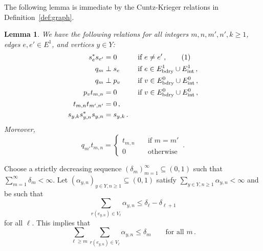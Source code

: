 \documentclass[12pt, a4paper]
{amsart}
\newcommand\numberthis{\addtocounter{equation}{1}\tag{\theequation}}
\newtheorem{lemma}[thm]{Lemma}
\theoremstyle{definition}
\theoremstyle{remark}
\numberwithin{equation}{section}
\newcommand{\Eboundary}{E^0_{\mathrm{bdry}}}
\newcommand{\Eint}{E^0_{\mathrm{int}}}
\newcommand{\edgebdy}{E^1_{\mathrm{bdry}}}
\newcommand{\edgeint}{E^1_{\mathrm{int}}}
\begin{document}
The following lemma is immediate by the Cuntz-Krieger relations in Definition~\ref{def:graph}.
\begin{lemma}\label{lemma:orthogonality}
    We have the following relations for all integers $m,n,m',n',k \ge 1$, edges $e, e' \in E^1$, and vertices $y \in Y$:
    \begin{align*}
    s_e^* s_{e'} &= 0 &&\text{ if } e \neq e'\,,\numberthis\\
    q_m &\perp s_e  &&\text{ if } e \in \edgebdy \cup \edgeint\,,\\
    q_m &\perp p_v  &&\text{ if } v \in \Eboundary \cup \Eint\,,\\    
    p_v t_{m,n} &= 0 &&\text{ if } v \in \Eboundary \cup \Eint\,,\\
    t_{m,n} t_{m',n'} &= 0\,, \\
    s_{y,k} s_{y,n}^* s_{y,n} &= s_{y,k}\,.
    \end{align*}
    Moreover, 
    \begin{equation}
        q_{m'} t_{m,n} =
    \begin{cases}
        t_{m,n} \quad &\text{if } m = m'\\
        0 \quad &\text{otherwise}
    \end{cases}\,.
    \end{equation}
\end{lemma}

Choose a strictly decreasing sequence $(\delta_m)_{m=1}^\infty \subseteq (0, 1)$ such that $\sum_{m=1}^\infty \delta_m < \infty$. Let $(\alpha_{y,n})_{y \in Y,n \ge 1} \subseteq (0,1)$ satisfy $\sum_{y \in Y, n \ge 1} \alpha_{y,n} < \infty$ and be such that 
\begin{equation}
    \sum_{r(e_{y,n}) \in V_\ell} \alpha_{y,n} \le \delta_\ell - \delta_{\ell+1}
\end{equation}
for all $\ell$. This implies that
\begin{equation}\label{DecompOfa_less_delta}
   \sum_{\ell \ge m} \sum_{r(e_{y,n}) \in V_\ell} \alpha_{y,n} \le \delta_m \quad\quad \text{for all }m\,.
\end{equation}
\end{document}
